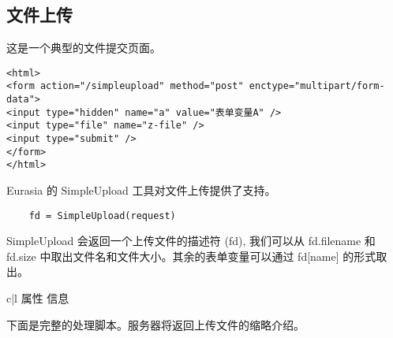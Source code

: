 \documentclass{manual}
\begin{document}

\subsection{文件上传}

这是一个典型的文件提交页面。

\begin{verbatim}
<html>
<form action="/simpleupload" method="post" enctype="multipart/form-data">
<input type="hidden" name="a" value="表单变量A" />
<input type="file" name="z-file" />
<input type="submit" />
</form>
</html>
\end{verbatim}

Eurasia 的 SimpleUpload 工具对文件上传提供了支持。

\begin{verbatim}
	fd = SimpleUpload(request)
\end{verbatim}

SimpleUpload 会返回一个上传文件的描述符 (fd), 我们可以从 fd.filename 和 fd.size 中取出文件名和文件大小。其余的表单变量可以通过 fd[name] 的形式取出。

\begin{tableii}{c|l}{}{ 属性 }{ 信息 }
\end{tableii}

下面是完整的处理脚本。服务器将返回上传文件的缩略介绍。
\end{document}
